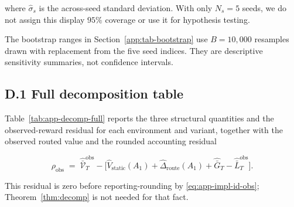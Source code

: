 \documentclass{article} %
\begin{document}
where \(\widehat\sigma_s\) is the across-seed standard deviation. With only
\(N_s=5\) seeds, we do not assign this display \(95\%\) coverage or use it for
hypothesis testing.

The bootstrap ranges in Section~\ref{app:tab-bootstrap} use \(B=10{,}000\)
resamples drawn with replacement from the five seed indices. They are
descriptive sensitivity summaries, not confidence intervals.

\subsection{D.1 Full decomposition table}

\label{app:tab-decomp}

Table~\ref{tab:app-decomp-full} reports the three structural quantities and the
observed-reward residual for each environment and variant, together with the
observed routed value and the rounded accounting residual

\begin{equation}
\label{eq:app-tab-residual}
\rho_{\mathrm{obs}}
\;=\;
\widehat{\bar{\mathcal V}}_T^{\mathrm{obs}}
- \big[\widehat V_{\mathrm{static}}(A_1)
+ \widehat\Delta_{\mathrm{route}}(A_1)
+ \widehat{\bar G}_T
- \widehat{\bar L}_T^{\mathrm{obs}}\big].
\end{equation}

This residual is zero before reporting-rounding by
\eqref{eq:app-impl-id-obs}; Theorem~\ref{thm:decomp} is not needed for that
fact.
\end{document}
